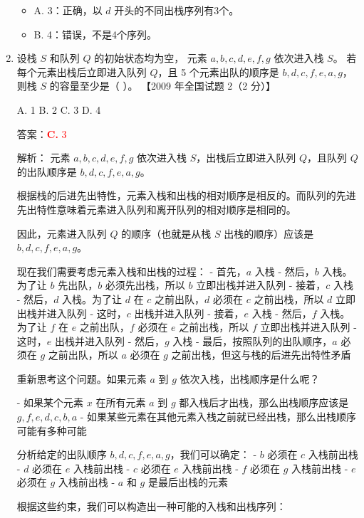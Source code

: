 \documentclass[lang=cn,newtx,10pt,scheme=chinese]{../../../elegantbook}
\begin{document}
\begin{enumerate}
    \begin{itemize}
        \item A. 3：正确，以 $d$ 开头的不同出栈序列有3个。
        \item B. 4：错误，不是4个序列。
    \end{itemize}

    \item 设栈 $S$ 和队列 $Q$ 的初始状态均为空，
    元素 $a, b, c, d, e,f,g$ 依次进入栈 $S$。
    若每个元素出栈后立即进入队列 $Q$，且 5 个元素出队的顺序是 
    $b, d,c,f,e,a,g$，则栈 $S$ 的容量至少是（ ）。  
    【2009 年全国试题 2（2 分）】  
   
    A. 1 \quad B. 2 \quad C. 3 \quad D. 4  

    答案：\textcolor{red}{\textbf{C.} 3}

    解析：
    元素 $a, b, c, d, e, f, g$ 依次进入栈 $S$，出栈后立即进入队列 $Q$，且队列 $Q$ 的出队顺序是 $b, d, c, f, e, a, g$。

    根据栈的后进先出特性，元素入栈和出栈的相对顺序是相反的。而队列的先进先出特性意味着元素进入队列和离开队列的相对顺序是相同的。
    
    因此，元素进入队列 $Q$ 的顺序（也就是从栈 $S$ 出栈的顺序）应该是 $b, d, c, f, e, a, g$。

    现在我们需要考虑元素入栈和出栈的过程：
        - 首先，$a$ 入栈
    - 然后，$b$ 入栈。为了让 $b$ 先出队，$b$ 必须先出栈，所以 $b$ 立即出栈并进入队列
    - 接着，$c$ 入栈
    - 然后，$d$ 入栈。为了让 $d$ 在 $c$ 之前出队，$d$ 必须在 $c$ 之前出栈，所以 $d$ 立即出栈并进入队列
    - 这时，$c$ 出栈并进入队列
    - 接着，$e$ 入栈
    - 然后，$f$ 入栈。为了让 $f$ 在 $e$ 之前出队，$f$ 必须在 $e$ 之前出栈，所以 $f$ 立即出栈并进入队列
    - 这时，$e$ 出栈并进入队列
    - 然后，$g$ 入栈
    - 最后，按照队列的出队顺序，$a$ 必须在 $g$ 之前出队，所以 $a$ 必须在 $g$ 之前出栈，但这与栈的后进先出特性矛盾

    重新思考这个问题。如果元素 $a$ 到 $g$ 依次入栈，出栈顺序是什么呢？

    - 如果某个元素 $x$ 在所有元素 $a$ 到 $g$ 都入栈后才出栈，那么出栈顺序应该是 $g, f, e, d, c, b, a$
    - 如果某些元素在其他元素入栈之前就已经出栈，那么出栈顺序可能有多种可能

    分析给定的出队顺序 $b, d, c, f, e, a, g$，我们可以确定：
    - $b$ 必须在 $c$ 入栈前出栈
    - $d$ 必须在 $e$ 入栈前出栈
    - $c$ 必须在 $e$ 入栈前出栈
    - $f$ 必须在 $g$ 入栈前出栈
    - $e$ 必须在 $g$ 入栈前出栈
    - $a$ 和 $g$ 是最后出栈的元素

    根据这些约束，我们可以构造出一种可能的入栈和出栈序列：


\end{enumerate}
\end{document}
